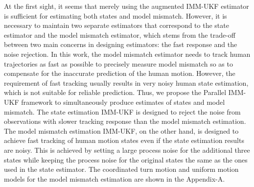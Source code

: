 \documentclass[journal]{IEEEtran}
\begin{document}
    At the first sight, it seems that merely using the augmented IMM-UKF estimator is sufficient for estimating both states and model mismatch.    
    However, it is necessary to maintain two separate estimators that correspond to the state estimator and the  model mismatch estimator, which stems from the trade-off between two main concerns in designing estimators: the fast response and the noise rejection.
    In this work, the model mismatch estimator needs to track human trajectories as fast as possible to precisely measure model mismatch so as to compensate for the inaccurate prediction of the human motion.
	However, the requirement of fast tracking usually results in very noisy human state estimation, which is not suitable for reliable prediction.
   Thus, we propose the Parallel IMM-UKF framework to simultaneously produce estimates of states and model mismatch. 
    The state estimation IMM-UKF is designed to reject the noise from observations with slower tracking response than the model mismatch estimation. 
    The model mismatch estimation IMM-UKF, on the other hand, is designed to achieve fast tracking of human motion states even if the state estimation results are noisy.
    This is achieved by setting a large process noise for the additional three states while keeping the process noise for the original states the same as the ones used in the state estimator.
    The coordinated turn motion and uniform motion models for the model mismatch estimation are shown in the Appendix-A.           
\end{document}
